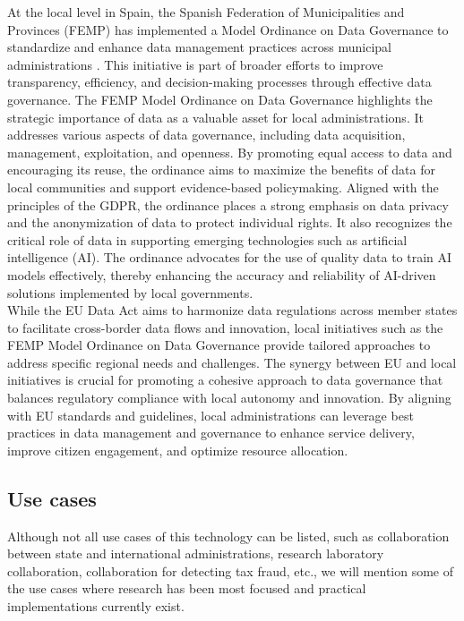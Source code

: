 At the local level in Spain, the Spanish Federation of Municipalities and Provinces (FEMP) has implemented a Model Ordinance on Data Governance to standardize and enhance data management practices across municipal administrations \cite{zotero-168}. This initiative is part of broader efforts to improve transparency, efficiency, and decision-making processes through effective data governance. The FEMP Model Ordinance on Data Governance highlights the strategic importance of data as a valuable asset for local administrations. It addresses various aspects of data governance, including data acquisition, management, exploitation, and openness. By promoting equal access to data and encouraging its reuse, the ordinance aims to maximize the benefits of data for local communities and support evidence-based policymaking.
Aligned with the principles of the GDPR, the ordinance places a strong emphasis on data privacy and the anonymization of data to protect individual rights. It also recognizes the critical role of data in supporting emerging technologies such as artificial intelligence (AI). The ordinance advocates for the use of quality data to train AI models effectively, thereby enhancing the accuracy and reliability of AI-driven solutions implemented by local governments.\\

While the EU Data Act aims to harmonize data regulations across member states to facilitate cross-border data flows and innovation, local initiatives such as the FEMP Model Ordinance on Data Governance provide tailored approaches to address specific regional needs and challenges. The synergy between EU and local initiatives is crucial for promoting a cohesive approach to data governance that balances regulatory compliance with local autonomy and innovation. By aligning with EU standards and guidelines, local administrations can leverage best practices in data management and governance to enhance service delivery, improve citizen engagement, and optimize resource allocation.


\subsection{Use cases}

Although not all use cases of this technology can be listed, such as collaboration between state and international administrations, research laboratory collaboration, collaboration for detecting tax fraud, etc., we will mention some of the use cases where research has been most focused and practical implementations currently exist.

